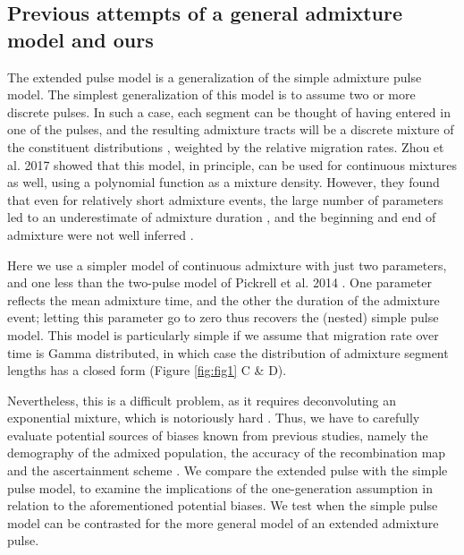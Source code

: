 \documentclass[]{article}
\begin{document}
\subsection{Previous attempts of a general admixture model and ours}\label{Previous attempts of a general admixture model and ours}

The extended pulse model is a generalization of the simple admixture pulse model. The simplest generalization of this model is to assume two or more discrete pulses. In such a case,  each segment can be thought of having entered in one of the pulses, and the resulting admixture tracts will be a discrete mixture of the constituent distributions \citep{pickrell_ancient_2014}, weighted by the relative migration rates. Zhou et al. 2017 \citep{zhou_modeling_2017} showed that this model, in principle, can be used for continuous mixtures as well, using a polynomial function as a mixture density. However, they found that even for relatively short admixture events, the large number of parameters led to an underestimate of admixture duration \citep{zhou_inference_2017}, and the beginning and end of admixture were not well inferred
\citep{zhou_modeling_2017,zhou_inference_2017}. 

Here we use a simpler model of continuous admixture with just two parameters, and one less than the two-pulse model of Pickrell et al. 2014 \citep{pickrell_ancient_2014}. One parameter reflects the mean admixture time, and the other the duration of the admixture event; letting this parameter go to zero thus recovers the (nested) simple pulse model. 
This model is particularly simple if we assume that migration rate over time is Gamma distributed, in which case the distribution of admixture segment lengths has a closed form (Figure \ref{fig:fig1} C & D).

Nevertheless, this is a difficult problem, as it requires deconvoluting an exponential mixture, which is notoriously hard \citep{dasgupta_mixture_2008}. Thus, we have to carefully evaluate potential sources of biases known from previous studies, namely the demography of the admixed population, the accuracy of the recombination map and the ascertainment scheme \citep{sankararaman_date_2012,fu_genome_2014,moorjani_genetic_2016}.
We compare the extended pulse with the simple pulse model, to examine the implications of the one-generation assumption in relation to the aforementioned potential biases. We test when the simple pulse model can be contrasted for the more general model of an extended admixture pulse.
\end{document}
